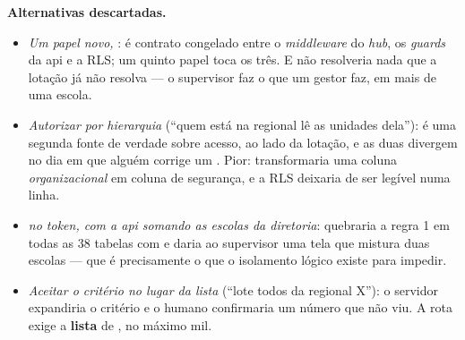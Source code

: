 \textbf{Alternativas descartadas.}
\begin{itemize}
  \item \emph{Um papel novo, }:  é contrato congelado
    entre o \emph{middleware} do \emph{hub}, os \emph{guards} da api e a RLS; um
    quinto papel toca os três. E não resolveria nada que a lotação já não
    resolva --- o supervisor faz o que um gestor faz, em mais de uma escola.
  \item \emph{Autorizar por hierarquia} (\enquote{quem está na regional lê as
    unidades dela}): é uma segunda fonte de verdade sobre acesso, ao lado da
    lotação, e as duas divergem no dia em que alguém corrige um .
    Pior: transformaria uma coluna \emph{organizacional} em coluna de segurança,
    e a RLS deixaria de ser legível numa linha.
  \item \emph{ no \emph{token}, com a api somando as escolas
    da diretoria}: quebraria a regra 1 em todas as 38 tabelas com 
    e daria ao supervisor uma tela que mistura duas escolas --- que é
    precisamente o que o isolamento lógico existe para impedir.
  \item \emph{Aceitar o critério no lugar da lista} (\enquote{lote todos da
    regional X}): o servidor expandiria o critério e o humano confirmaria um
    número que não viu. A rota exige a \textbf{lista} de , no
    máximo mil.
\end{itemize}

